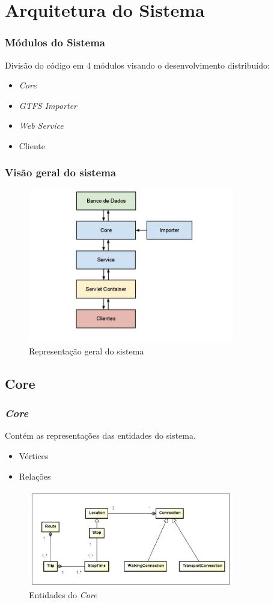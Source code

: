 \section{Arquitetura do Sistema}
\frame
{
\frametitle{Módulos do Sistema}
Divisão do código em 4 módulos visando o desenvolvimento distribuído:
\begin{itemize}
\item \emph{Core}
\item \emph{GTFS Importer}
\item \emph{Web Service}
\item Cliente
\end{itemize}
}

\frame
{
\frametitle{Visão geral do sistema}
\begin{figure}
\includegraphics[width=0.8\textwidth]{./imgs/arquitetura.png}
\caption{Representação geral do sistema}
\end{figure}

}

\subsection{Core}
\frame
{
\frametitle{\emph{Core}}
Contém as representações das entidades do sistema.
\begin{itemize}
\item Vértices
\item Relações
\end{itemize}
\begin{figure}
\includegraphics[width=0.8\textwidth]{./imgs/CoreDiagram.png}
\caption{Entidades do \emph{Core}}
\end{figure}

}

